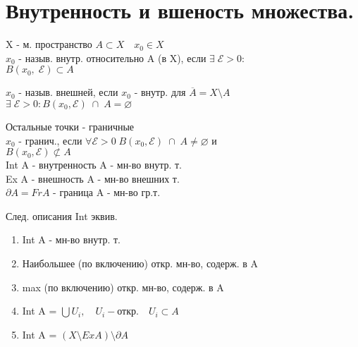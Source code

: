 \documentclass[geometry.tex]{subfiles}
\begin{document}
  \section{Внутренность и вшеность множества.}

  \begin{definition}
      X - м. пространство $A \subset X \quad x_0 \in X$\\
      $x_0$ - назыв. внутр. относительно A (в X), если $\exists \; \mathcal{E} > 0:$\\
      $B(x_0, \; \mathcal{E}) \subset A$
  \end{definition}

  \begin{definition}
      $x_0$ - назыв. внешней, если $x_0$ - внутр. для $\overline{A} = X \setminus A$\\
      $\exists \; \mathcal{E} > 0 : B(x_0, \mathcal{E}) \; \cap \; A = \varnothing$
  \end{definition}

  \begin{definition}
      Остальные точки - граничные\\
      $x_0$ - гранич., если $\forall \mathcal{E} > 0 \; B(x_0, \mathcal{E}) \; \cap \; A \neq \varnothing$ и\\
      $B(x_0, \mathcal{E}) \not\subset A$\\
      Int A - внутренность A - мн-во внутр. т.\\
      Ex A - внешность A - мн-во внешних т.\\
      $\partial A = Fr A$ - граница A - мн-во гр.т.
  \end{definition}

  \begin{theorem}
      След. описания Int эквив.\\
      \begin{enumerate}
          \item Int A - мн-во внутр. т.
          \item Наибольшее (по включению) откр. мн-во, содерж. в A
          \item max (по включению) откр. мн-во, содерж. в A
          \item Int A = $\bigcup U_i, \quad U_i - \text{откр.} \quad U_i \subset A$
          \item Int A = $(X \setminus Ex A) \setminus \partial A$
      \end{enumerate}
  \end{theorem}
\end{document}
